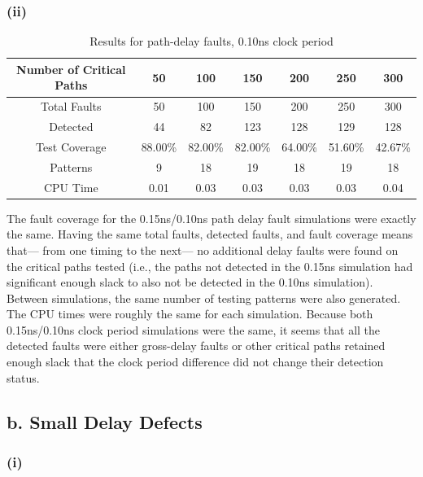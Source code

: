 \documentclass[letterpaper]{article} %
\begin{document}
\subsubsection*{(ii)}

\begin{table}[ht]
\centering
\begin{tabular}{|c|c|c|c|c|c|c|}
\hline
Number of Critical Paths & 50      & 100     & 150     & 200     & 250     & 300     \\ \hline
Total Faults             & 50      & 100     & 150     & 200     & 250     & 300     \\ \hline
Detected                 & 44      & 82      & 123     & 128     & 129     & 128     \\ \hline
Test Coverage            & 88.00\% & 82.00\% & 82.00\% & 64.00\% & 51.60\% & 42.67\% \\ \hline
Patterns                 & 9       & 18      & 19      & 18      & 19      & 18      \\ \hline
CPU Time                 & 0.01    & 0.03    & 0.03    & 0.03    & 0.03    & 0.04    \\ \hline
\end{tabular}
\caption{Results for path-delay faults, 0.10ns clock period}
\end{table}
The fault coverage for the 0.15ns/0.10ns path delay fault simulations were exactly the same. Having the same total faults, detected faults, and fault coverage means that--- from one timing to the next--- no additional delay faults were found on the critical paths tested (i.e., the paths not detected in the 0.15ns simulation had significant enough slack to also not be detected in the 0.10ns simulation). Between simulations, the same number of testing patterns were also generated. The CPU times were roughly the same for each simulation. Because both 0.15ns/0.10ns clock period simulations were the same, it seems that all the detected faults were either gross-delay faults or other critical paths retained enough slack that the clock period difference did not change their detection status.

\subsection*{b. Small Delay Defects}
\subsubsection*{(i)}
\end{document}
